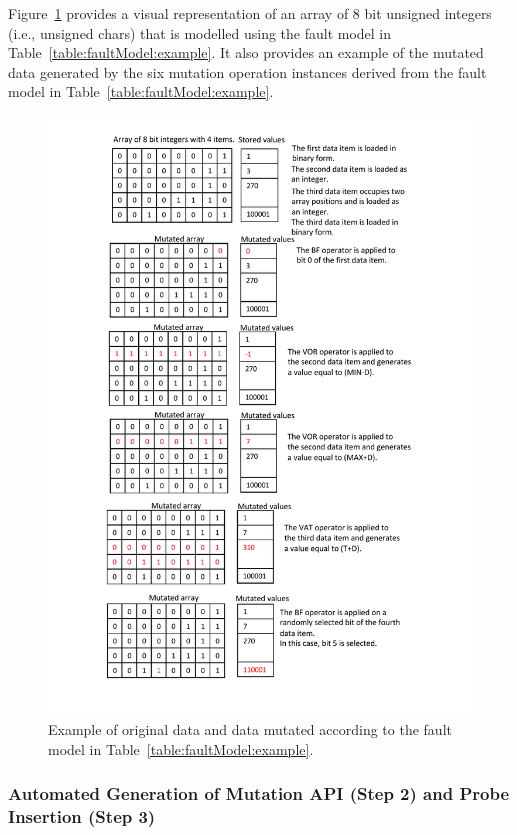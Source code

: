 Figure~\ref{fig:dataMutationFMExamples} provides a visual representation of an array of 8 bit unsigned integers (i.e., unsigned chars) that is modelled using the  fault model in Table~\ref{table:faultModel:example}. It also provides an example of the mutated data generated by the six mutation operation instances derived from the fault model in Table~\ref{table:faultModel:example}.




\begin{figure}[h]
  \centering
    \includegraphics[width=12cm]{images/dataMutationFMExample.pdf}
      \caption{Example of original data and  data mutated according to the fault model in Table~\ref{table:faultModel:example}.}
      \label{fig:dataMutationFMExamples}
\end{figure}








\subsubsection{Automated Generation of Mutation API (Step 2) and Probe Insertion (Step 3)}
\label{sec:generateAPI}

